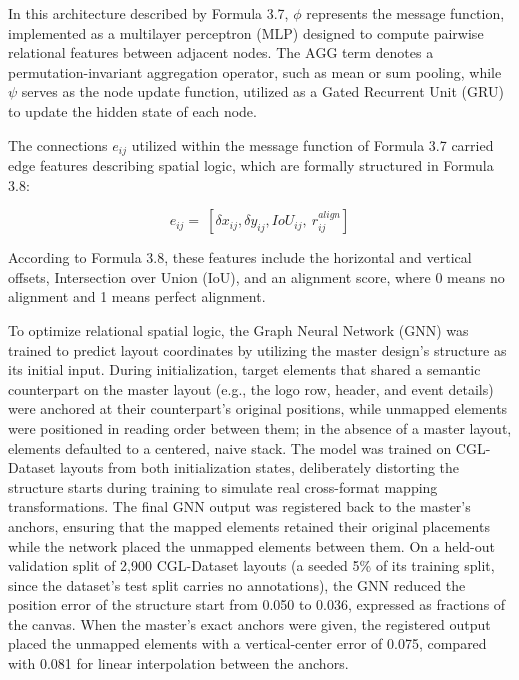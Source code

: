 \begin{refsection}
In this architecture described by Formula 3.7, $\phi$ represents the message function, implemented as a multilayer perceptron (MLP) designed to compute pairwise relational features between adjacent nodes. The $\text{AGG}$ term denotes a permutation-invariant aggregation operator, such as mean or sum pooling, while $\psi$ serves as the node update function, utilized as a Gated Recurrent Unit (GRU) to update the hidden state of each node.

The connections $e_{ij}$ utilized within the message function of Formula 3.7 carried edge features describing spatial logic, which are formally structured in Formula 3.8:
\begin{center}
\begin{minipage}{0.8\textwidth}
\begin{equation}
e_{ij}=\ [{\delta x}_{ij},{\delta y}_{ij},{IoU}_{ij},\ r_{ij}^{align}]
\end{equation}
\centering
\end{minipage}
\end{center}

According to Formula 3.8, these features include the horizontal and vertical offsets, Intersection over Union (IoU), and an alignment score, where 0 means no alignment and 1 means perfect alignment.

To optimize relational spatial logic, the Graph Neural Network (GNN) was trained to predict layout coordinates by utilizing the master design's structure as its initial input. During initialization, target elements that shared a semantic counterpart on the master layout (e.g., the logo row, header, and event details) were anchored at their counterpart's original positions, while unmapped elements were positioned in reading order between them; in the absence of a master layout, elements defaulted to a centered, naive stack. The model was trained on CGL-Dataset layouts from both initialization states, deliberately distorting the structure starts during training to simulate real cross-format mapping transformations. The final GNN output was registered back to the master's anchors, ensuring that the mapped elements retained their original placements while the network placed the unmapped elements between them. On a held-out validation split of 2,900 CGL-Dataset layouts (a seeded 5\% of its training split, since the dataset's test split carries no annotations), the GNN reduced the position error of the structure start from 0.050 to 0.036, expressed as fractions of the canvas. When the master's exact anchors were given, the registered output placed the unmapped elements with a vertical-center error of 0.075, compared with 0.081 for linear interpolation between the anchors.


\end{refsection}
